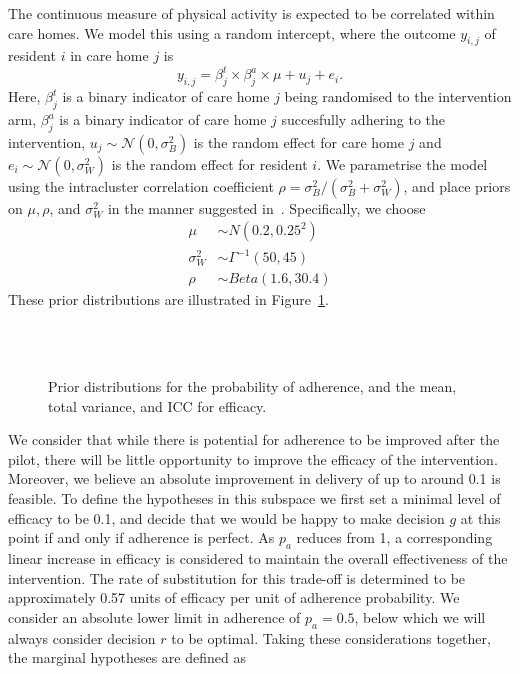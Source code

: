 \documentclass{article} %
\begin{document}
The continuous measure of physical activity is expected to be correlated within care homes. We model this using a random intercept, where the outcome $y_{i,j}$ of resident $i$ in care home $j$ is
\begin{equation}
y_{i,j} = \beta^{t}_{j} \times \beta^{a}_{j} \times \mu + u_{j} + e_{i}.
\end{equation}
Here, $\beta^{t}_{j}$ is a binary indicator of care home $j$ being randomised to the intervention arm, $\beta^{a}_{j}$ is a binary indicator of care home $j$ succesfully adhering to the intervention, $u_{j} \sim \mathcal{N}(0, \sigma_{B}^{2})$ is the random effect for care home $j$ and $e_{i} \sim \mathcal{N}(0, \sigma_{W}^{2})$ is the random effect for resident $i$. We parametrise the model using the intracluster correlation coefficient $\rho = \sigma_{B}^{2} / (\sigma_{B}^{2} + \sigma_{W}^{2})$, and place priors on $\mu, \rho$, and $\sigma_{W}^{2}$ in the manner suggested in~\cite{Spiegelhalter2001}. Specifically, we choose
\begin{align}
\mu & \sim N(0.2, 0.25^{2}) \\
\sigma_{W}^{2} & \sim \Gamma^{-1}(50, 45) \\
\rho & \sim Beta(1.6, 30.4)
\end{align}
These prior distributions are illustrated in Figure~\ref{fig:priors2}. 

\begin{figure}
   \centering
   \quad
   \\
   \quad
   \\
   \caption{Prior distributions for the probability of adherence, and the mean, total variance, and ICC for efficacy.}
   \label{fig:priors2}
\end{figure}

We consider that while there is potential for adherence to be improved after the pilot, there will be little opportunity to improve the efficacy of the intervention. Moreover, we believe an absolute improvement in delivery of up to around 0.1 is feasible. To define the hypotheses in this subspace we first set a minimal level of efficacy to be 0.1, and decide that we would be happy to make decision $g$ at this point if and only if adherence is perfect. As $p_{a}$ reduces from 1, a corresponding linear increase in efficacy is considered to maintain the overall effectiveness of the intervention. The rate of substitution for this trade-off is determined to be approximately 0.57 units of efficacy per unit of adherence probability. We consider an absolute lower limit in adherence of $p_{a} = 0.5$, below which we will always consider decision $r$ to be optimal. Taking these considerations together, the marginal hypotheses are defined as
\end{document}
